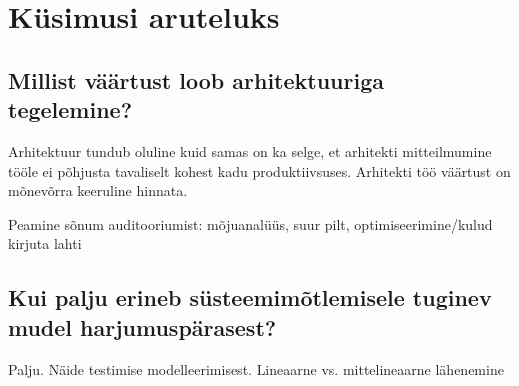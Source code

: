 	
\section{Küsimusi aruteluks}
\subsection{Millist väärtust loob arhitektuuriga tegelemine?}
Arhitektuur tundub oluline kuid samas on ka selge, et arhitekti mitteilmumine tööle ei põhjusta tavaliselt kohest kadu produktiivsuses. Arhitekti töö väärtust on mõnevõrra keeruline hinnata. 

Peamine sõnum auditooriumist: mõjuanalüüs, suur pilt, optimiseerimine/kulud
\TODO kirjuta lahti

\subsection{Kui palju erineb süsteemimõtlemisele tuginev mudel harjumuspärasest?}
Palju.
\TODO Näide testimise modelleerimisest. Lineaarne vs. mittelineaarne lähenemine
